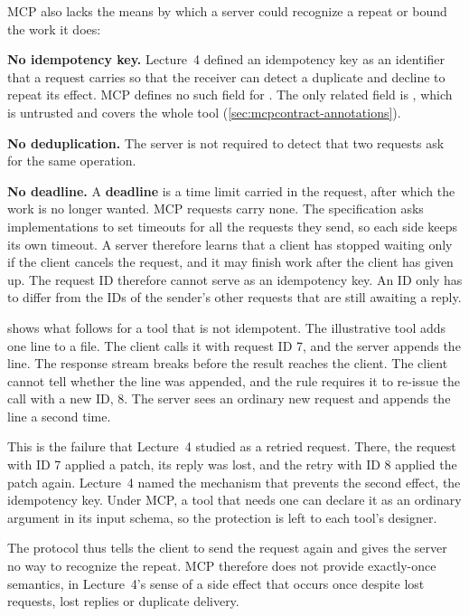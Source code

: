MCP also lacks the means by which a server could recognize a repeat or bound the work it does:
\bi
\item \textbf{No idempotency key.} Lecture~4 defined an idempotency key as an identifier that a
request carries so that the receiver can detect a duplicate and decline to repeat its effect. MCP
defines no such field for . The only related field is ,
which is untrusted and covers the whole tool (\cref{sec:mcpcontract-annotations}).
\item \textbf{No deduplication.} The server is not required to detect that two requests ask for the
same operation.
\item \textbf{No deadline.} A \textbf{deadline} is a time limit carried in the request, after which the
work is no longer wanted. MCP requests carry none. The specification asks implementations to set
timeouts for all the requests they send, so each side keeps its own timeout. A server therefore
learns that a client has stopped waiting only if the client cancels the request, and it may finish
work after the client has given up.
\ei
The request ID therefore cannot serve as an idempotency key. An ID only has to differ from the IDs
of the sender's other requests that are still awaiting a reply.

 shows what follows for a tool that is not idempotent. The illustrative
tool  adds one line to a file. The client calls it with request ID 7, and the
server appends the line. The response stream breaks before the result reaches the client. The client
cannot tell whether the line was appended, and the rule requires it to re-issue the call with a new
ID, 8. The server sees an ordinary new request and appends the line a second time.

This is the failure that Lecture~4 studied as a retried request. There, the request with ID 7
applied a patch, its reply was lost, and the retry with ID 8 applied the patch again. Lecture~4
named the mechanism that prevents the second effect, the idempotency key. Under MCP, a tool that
needs one can declare it as an ordinary argument in its input schema, so the protection is left to
each tool's designer.

The protocol thus tells the client to send the request again and gives the server no way to
recognize the repeat. MCP therefore does not provide exactly-once semantics, in Lecture~4's sense of
a side effect that occurs once despite lost requests, lost replies or duplicate delivery.

